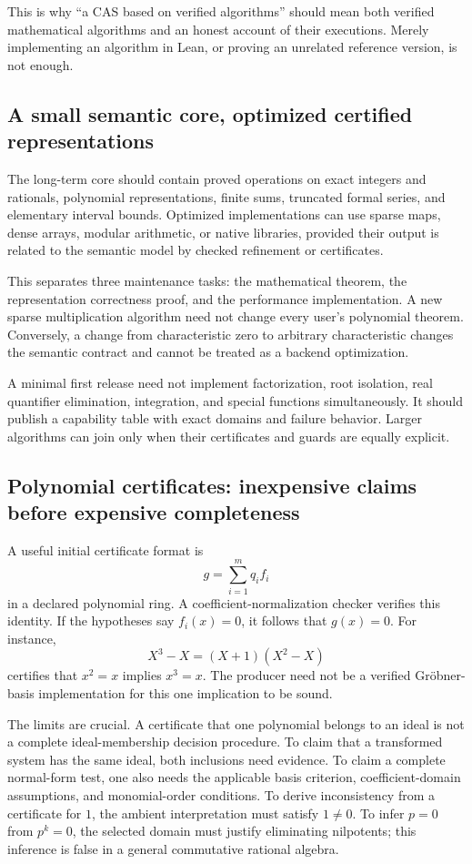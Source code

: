 \documentclass[11pt,letterpaper]{article}
\theoremstyle{definition}
\begin{document}
This is why ``a CAS based on verified algorithms'' should mean both verified
mathematical algorithms and an honest account of their executions. Merely
implementing an algorithm in Lean, or proving an unrelated reference version,
is not enough.

\subsection{A small semantic core, optimized certified representations}
The long-term core should contain proved operations on exact integers and
rationals, polynomial representations, finite sums, truncated formal series,
and elementary interval bounds. Optimized implementations can use sparse maps,
dense arrays, modular arithmetic, or native libraries, provided their output is
related to the semantic model by checked refinement or certificates.

This separates three maintenance tasks: the mathematical theorem, the representation
correctness proof, and the performance implementation. A new sparse multiplication
algorithm need not change every user's polynomial theorem. Conversely, a change
from characteristic zero to arbitrary characteristic changes the semantic contract
and cannot be treated as a backend optimization.

A minimal first release need not implement factorization, root isolation, real
quantifier elimination, integration, and special functions simultaneously. It
should publish a capability table with exact domains and failure behavior. Larger
algorithms can join only when their certificates and guards are equally explicit.

\subsection{Polynomial certificates: inexpensive claims before expensive completeness}
A useful initial certificate format is
\[
 g=\sum_{i=1}^{m}q_i f_i
\]
in a declared polynomial ring. A coefficient-normalization checker verifies this
identity. If the hypotheses say \(f_i(x)=0\), it follows that \(g(x)=0\).
For instance,
\[
 X^3-X=(X+1)(X^2-X)
\]
certifies that \(x^2=x\) implies \(x^3=x\). The producer need not be a verified
Gr\"obner-basis implementation for this one implication to be sound.

The limits are crucial. A certificate that one polynomial belongs to an ideal
is not a complete ideal-membership decision procedure. To claim that a transformed
system has the same ideal, both inclusions need evidence. To claim a complete
normal-form test, one also needs the applicable basis criterion, coefficient-domain
assumptions, and monomial-order conditions. To derive inconsistency from a
certificate for \(1\), the ambient interpretation must satisfy \(1\ne0\).
To infer \(p=0\) from \(p^k=0\), the selected domain must justify eliminating
nilpotents; this inference is false in a general commutative rational algebra.
\end{document}

